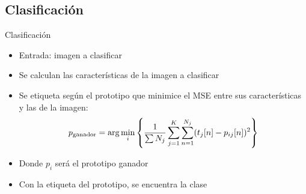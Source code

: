 \documentclass[spanish]{beamer}
\begin{document}
\subsection{Clasificación}
\begin{frame}{Clasificación}
  \begin{itemize}
  \item Entrada: imagen a clasificar
  \item Se calculan las características de la imagen a clasificar
  \item Se etiqueta según el prototipo que minimice el MSE entre sus
    características y las de la imagen:
\begin{equation}
  p_{\textrm{ganador}}=\arg \min_i\left\{ \frac{1}{\sum N_j}
                \sum_{j=1}^K\sum_{n=1}^{N_j}(t_j[n]-p_{ij}[n])^2\right\}
\end{equation}
\item Donde $p_i$ será el prototipo ganador
\item Con la etiqueta del prototipo, se encuentra la clase
  \end{itemize}
\end{frame}
%
\end{document}
